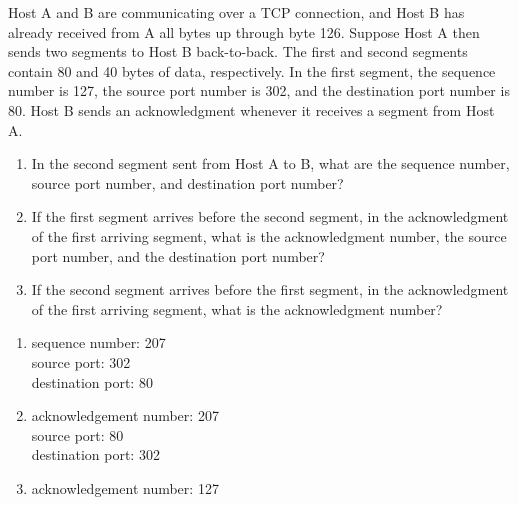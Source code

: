 \documentclass{report}
\begin{document}
\clearpage
\begin{problem}

Host A and B are communicating over a TCP connection, and Host B has
already received from A all bytes up through byte 126. Suppose Host A then
sends two segments to Host B back-to-back. The first and second segments
contain 80 and 40 bytes of data, respectively. In the first segment, the
sequence number is 127, the source port number is 302, and the destination
port number is 80. Host B sends an acknowledgment whenever it receives a
segment from Host A.

\begin{enumerate}
\item In the second segment sent from Host A to B, what are the sequence
      number, source port number, and destination port number?

\item If the first segment arrives before the second segment, in the
      acknowledgment of the first arriving segment, what is the acknowledgment
      number, the source port number, and the destination port number?

\item If the second segment arrives before the first segment, in the
      acknowledgment of the first arriving segment, what is the acknowledgment
      number?

\end{enumerate}

\begin{answer}{24em}
  \begin{enumerate}
    \item sequence number: 207  \\
          source port: 302 \\
          destination port: 80
    \item acknowledgement number: 207 \\
          source port: 80 \\
          destination port: 302
    \item acknowledgement number: 127
  \end{enumerate}
\end{answer}

\end{problem}
\end{document}
